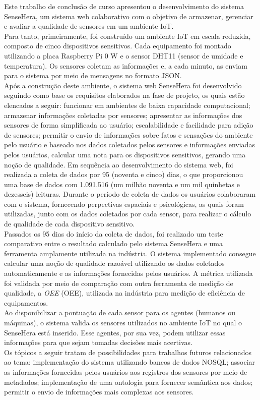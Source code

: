 \null \quad Este trabalho de conclusão de curso apresentou o desenvolvimento do sistema SenseHera, um sistema web colaborativo com o objetivo de armazenar, gerenciar e avaliar a qualidade de sensores em um ambiente \acrlong{IoT}.
\\\null \quad Para tanto, primeiramente, foi construído um ambiente \acrshort{IoT} em escala reduzida, composto de cinco dispositivos sensitivos. Cada equipamento foi montado utilizando a placa Raspberry Pi 0 W e o sensor DHT11 (sensor de umidade e temperatura). Os sensores coletam as informações e, a cada minuto, as enviam para o sistema por meio de mensagens no formato JSON.
\\\null \quad Após a construção deste ambiente, o sistema web SenseHera foi desenvolvido seguindo como base os requisitos elaborados na fase de projeto, os quais estão elencados a seguir: funcionar em ambientes de baixa capacidade computacional; armazenar informações coletadas por sensores; apresentar as informações dos sensores de forma simplificada ao usuário; escalabilidade e facilidade para adição de sensores; permitir o envio de informações sobre fatos e sensações do ambiente pelo usuário e baseado nos dados coletados pelos sensores e informações enviadas pelos usuários, calcular uma nota para os dispositivos sensitivos, gerando uma noção de qualidade.
 \null \quad Em sequência ao desenvolvimento do sistema web, foi realizada a coleta de dados por 95 (noventa e cinco) dias, o que proporcionou uma base de dados com 1.091.516 (um milhão noventa e um mil quinhetas e dezesseis) leituras. Durante o período de coleta de dados os usuários colaboraram com o sistema, fornecendo perpectivas espaciais e psicológicas, as quais foram utilizadas, junto com os dados coletados por cada sensor, para realizar o cálculo de qualidade de cada dispositivo sensitivo.
 \\\null \quad Passados os 95 dias do início da coleta de dados, foi realizado um teste comparativo entre o resultado calculado pelo sistema SenseHera e uma ferramenta amplamente utilizada na indústria.
 O sistema implementado consegue calcular uma noção de qualidade razoável utilizando os dados coletados automaticamente e as informações fornecidas pelos usuários. A métrica utilizada foi validada por meio de comparação com outra ferramenta de medição de qualidade, a \textit{\acrlong{OEE}} (\acrshort{OEE}), utilizada na indústria para medição de eficiência de equipamentos.
 \\\null\quad Ao disponibilizar a pontuação de cada sensor para os agentes (humanos ou máquinas), o sistema valida os sensores utilizados no ambiente \acrshort{IoT} no qual o SenseHera está inserido. Esse agentes, por sua vez, podem utilizar essas informações para que sejam tomadas decisões mais acertivas.
\\\null \quad Os tópicos a seguir tratam de possibilidades para trabalhos futuros relacionados ao tema: implementação do sistema utilizando bancos de dados NOSQL; associar as informações fornecidas pelos usuários aos registros dos sensores por meio de metadados; implementação de uma ontologia para fornecer semântica aos dados; permitir o envio de informações mais complexas aos sensores.
